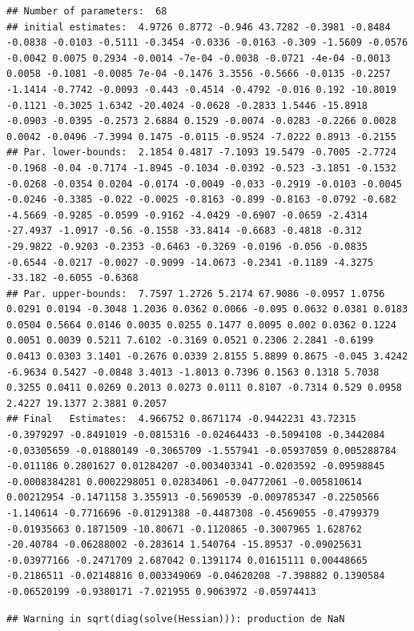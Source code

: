 \documentclass[11pt,]{article}
\begin{document}
\begin{verbatim}
## Number of parameters:  68 
## initial estimates:  4.9726 0.8772 -0.946 43.7282 -0.3981 -0.8484 -0.0838 -0.0103 -0.5111 -0.3454 -0.0336 -0.0163 -0.309 -1.5609 -0.0576 -0.0042 0.0075 0.2934 -0.0014 -7e-04 -0.0038 -0.0721 -4e-04 -0.0013 0.0058 -0.1081 -0.0085 7e-04 -0.1476 3.3556 -0.5666 -0.0135 -0.2257 -1.1414 -0.7742 -0.0093 -0.443 -0.4514 -0.4792 -0.016 0.192 -10.8019 -0.1121 -0.3025 1.6342 -20.4024 -0.0628 -0.2833 1.5446 -15.8918 -0.0903 -0.0395 -0.2573 2.6884 0.1529 -0.0074 -0.0283 -0.2266 0.0028 0.0042 -0.0496 -7.3994 0.1475 -0.0115 -0.9524 -7.0222 0.8913 -0.2155 
## Par. lower-bounds:  2.1854 0.4817 -7.1093 19.5479 -0.7005 -2.7724 -0.1968 -0.04 -0.7174 -1.8945 -0.1034 -0.0392 -0.523 -3.1851 -0.1532 -0.0268 -0.0354 0.0204 -0.0174 -0.0049 -0.033 -0.2919 -0.0103 -0.0045 -0.0246 -0.3385 -0.022 -0.0025 -0.8163 -0.899 -0.8163 -0.0792 -0.682 -4.5669 -0.9285 -0.0599 -0.9162 -4.0429 -0.6907 -0.0659 -2.4314 -27.4937 -1.0917 -0.56 -0.1558 -33.8414 -0.6683 -0.4818 -0.312 -29.9822 -0.9203 -0.2353 -0.6463 -0.3269 -0.0196 -0.056 -0.0835 -0.6544 -0.0217 -0.0027 -0.9099 -14.0673 -0.2341 -0.1189 -4.3275 -33.182 -0.6055 -0.6368 
## Par. upper-bounds:  7.7597 1.2726 5.2174 67.9086 -0.0957 1.0756 0.0291 0.0194 -0.3048 1.2036 0.0362 0.0066 -0.095 0.0632 0.0381 0.0183 0.0504 0.5664 0.0146 0.0035 0.0255 0.1477 0.0095 0.002 0.0362 0.1224 0.0051 0.0039 0.5211 7.6102 -0.3169 0.0521 0.2306 2.2841 -0.6199 0.0413 0.0303 3.1401 -0.2676 0.0339 2.8155 5.8899 0.8675 -0.045 3.4242 -6.9634 0.5427 -0.0848 3.4013 -1.8013 0.7396 0.1563 0.1318 5.7038 0.3255 0.0411 0.0269 0.2013 0.0273 0.0111 0.8107 -0.7314 0.529 0.0958 2.4227 19.1377 2.3881 0.2057 
## Final   Estimates:  4.966752 0.8671174 -0.9442231 43.72315 -0.3979297 -0.8491019 -0.0815316 -0.02464433 -0.5094108 -0.3442084 -0.03305659 -0.01880149 -0.3065709 -1.557941 -0.05937059 0.005288784 -0.011186 0.2801627 0.01284207 -0.003403341 -0.0203592 -0.09598845 -0.0008384281 0.0002298051 0.02834061 -0.04772061 -0.005810614 0.00212954 -0.1471158 3.355913 -0.5690539 -0.009785347 -0.2250566 -1.140614 -0.7716696 -0.01291388 -0.4487308 -0.4569055 -0.4799379 -0.01935663 0.1871509 -10.80671 -0.1120865 -0.3007965 1.628762 -20.40784 -0.06288002 -0.283614 1.540764 -15.89537 -0.09025631 -0.03977166 -0.2471709 2.687042 0.1391174 0.01615111 0.00448665 -0.2186511 -0.02148816 0.003349069 -0.04620208 -7.398882 0.1390584 -0.06520199 -0.9380171 -7.021955 0.9063972 -0.05974413
\end{verbatim}

\begin{verbatim}
## Warning in sqrt(diag(solve(Hessian))): production de NaN
\end{verbatim}
\end{document}
